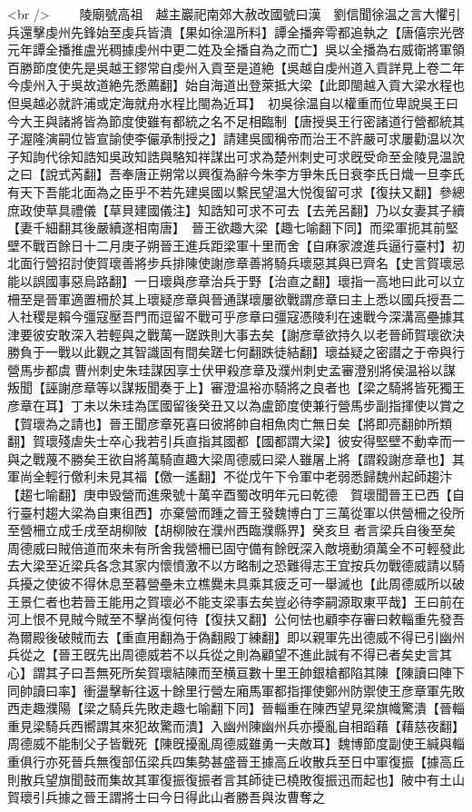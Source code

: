 <br />
　　陵廟號高祖　越主巖祀南郊大赦改國號曰漢　劉信聞徐温之言大懼引兵還擊虔州先鋒始至虔兵皆潰【果如徐溫所料】譚全播奔雩都追執之【唐僖宗光啓元年譚全播推盧光稠據虔州中更二姓及全播自為之而亡】吳以全播為右威衛將軍領百勝節度使先是吳越王鏐常自虔州入貢至是道絶【吳越自虔州道入貢詳見上卷二年今虔州入于吳故道絶先悉薦翻】始自海道出登萊抵大梁【此即閩越入貢大梁水程也但吳越必就許浦或定海就舟水程比閩為近耳】　初吳徐温自以權重而位卑說吳王曰今大王與諸將皆為節度使雖有都統之名不足相臨制【唐授吳王行密諸道行營都統其子渥隆演嗣位皆宣諭使李儼承制授之】請建吳國稱帝而治王不許嚴可求屢勸温以次子知詢代徐知誥知吳政知誥與駱知祥謀出可求為楚州刺史可求旣受命至金陵見温說之曰【說式芮翻】吾奉唐正朔常以興復為辭今朱李方爭朱氏日衰李氏日熾一旦李氏有天下吾能北面為之臣乎不若先建吳國以繫民望温大悦復留可求【復扶又翻】參總庶政使草具禮儀【草貝建國儀注】知誥知可求不可去【去羌呂翻】乃以女妻其子續【妻千細翻其後嚴續遂相南唐】　晉王欲趣大梁【趣七喻翻下同】而梁軍扼其前堅壁不戰百餘日十二月庚子朔晉王進兵距梁軍十里而舍【自麻家渡進兵逼行臺村】初北面行營招討使賀瓌善將步兵排陳使謝彦章善將騎兵瓌惡其與已齊名【史言賀瓌忌能以誤國事惡烏路翻】一日瓌與彦章治兵于野【治直之翻】瓌指一高地曰此可以立柵至是晉軍適置柵於其上瓌疑彦章與晉通謀瓌屢欲戰謂彦章曰主上悉以國兵授吾二人社稷是賴今彊寇壓吾門而逗留不戰可乎彦章曰彊寇憑陵利在速戰今深溝高壘據其津要彼安敢深入若輕與之戰萬一蹉跌則大事去矣【謝彦章欲持久以老晉師賀瓌欲決勝負于一戰以此觀之其智識固有間矣蹉七何翻跌徒結翻】瓌益疑之密譛之于帝與行營馬步都虞曹州刺史朱珪謀因享士伏甲殺彦章及濮州刺史孟審澄别將侯温裕以謀叛聞【誣謝彦章等以謀叛聞奏于上】審澄温裕亦騎將之良者也【梁之騎將皆死獨王彦章在耳】丁未以朱珪為匡國留後癸丑又以為盧節度使兼行營馬步副指揮使以賞之【賀瓌為之請也】晉王聞彦章死喜曰彼將帥自相魚肉亡無日矣【將即亮翻帥所類翻】賀瓌殘虐失士卒心我若引兵直指其國都【國都謂大梁】彼安得堅壁不動幸而一與之戰蔑不勝矣王欲自將萬騎直趣大梁周德威曰梁人雖屠上將【謂殺謝彦章也】其軍尚全輕行儌利未見其福【儌一遙翻】不從戊午下令軍中老弱悉歸魏州起師趨汴【趨七喻翻】庚申毁營而進衆號十萬辛酉蜀改明年元曰乾德　賀瓌聞晉王已西【自行臺村趨大梁為自東徂西】亦棄營而踵之晉王發魏博白丁三萬從軍以供營柵之役所至營柵立成壬戌至胡柳陂【胡柳陂在濮州西臨濮縣界】癸亥旦者言梁兵自後至矣周德威曰賊倍道而來未有所舍我營柵已固守備有餘旣深入敵境動須萬全不可輕發此去大梁至近梁兵各念其家内懷憤激不以方略制之恐難得志王宜按兵勿戰德威請以騎兵擾之使彼不得休息至暮營壘未立樵爨未具乘其疲乏可一舉滅也【此周德威所以破王景仁者也若晉王能用之賀瓌必不能支梁事去矣豈必待李嗣源取東平哉】王曰前在河上恨不見賊今賊至不擊尚復何待【復扶又翻】公何怯也顧李存審曰敕輜重先發吾為爾殿後破賊而去【重直用翻為于偽翻殿丁練翻】即以親軍先出德威不得已引幽州兵從之【晉王旣先出周德威若不以兵從之則為顧望不進此誠有不得已者矣史言其心】謂其子曰吾無死所矣賀瓌結陳而至横亘數十里王帥銀槍都陷其陳【陳讀曰陣下同帥讀曰率】衝盪擊斬往返十餘里行營左廂馬軍都指揮使鄭州防禦使王彦章軍先敗西走趣濮陽【梁之騎兵先敗走趣七喻翻下同】晉輜重在陳西望見梁旗幟驚潰【晉輜重見梁騎兵西嚮謂其來犯故驚而潰】入幽州陳幽州兵亦擾亂自相蹈藉【藉慈夜翻】周德威不能制父子皆戰死【陳旣擾亂周德威雖勇一夫敵耳】魏博節度副使王緘與輜重俱行亦死晉兵無復部伍梁兵四集勢甚盛晉王據高丘收散兵至日中軍復振【據高丘則散兵望旗聞鼓而集故其軍復振復振者言其師徒已橈敗復振迅而起也】陂中有土山賀瓌引兵據之晉王謂將士曰今日得此山者勝吾與汝曹奪之